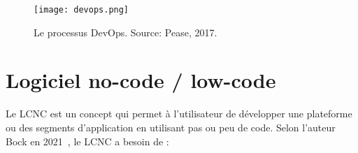 \begin{figure}[htb]
\centering
\texttt{[image: devops.png]}
\caption{Le processus DevOps. Source: Pease, 2017.~\cite{devops_illustration}}
\label{fig:devops}
\end{figure}


\section{Logiciel no-code / low-code}


Le LCNC est un concept qui permet à l’utilisateur de développer une plateforme ou des segments d'application en utilisant pas ou peu de code. Selon l'auteur Bock en 2021~\cite{LC_bock_2021}, le LCNC a besoin de : 
